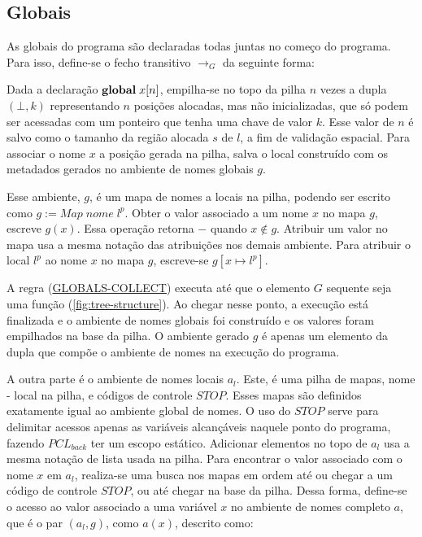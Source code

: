 \subsection{Globais}
\label{sec:pcl-back:semantica:globals}

As globais do programa são declaradas todas juntas no começo do programa. Para isso, define-se o fecho transitivo $\to_G$ da seguinte forma:


\noindent Dada a declaração $\mathbf{global}\;x[n]$, empilha-se no topo da pilha $n$ vezes a dupla $(\bot, k)$ representando $n$ posições alocadas, mas não inicializadas, que só podem ser acessadas com um ponteiro que tenha uma chave de valor $k$. Esse valor de $n$ é salvo como o tamanho da região alocada $s$ de $l$, a fim de validação espacial. Para associar o nome $x$ a posição gerada na pilha, salva o local construído com os metadados gerados no ambiente de nomes globais $g$.

Esse ambiente, $g$, é um mapa de nomes a locais na pilha, podendo ser escrito como $g := Map\;nome\;l^p$. Obter o valor associado a um nome $x$ no mapa $g$, escreve $g(x)$. Essa operação  retorna $-$ quando $x \notin g$. Atribuir um valor no mapa usa a mesma notação das atribuições nos demais ambiente. Para atribuir o local $l^p$ ao nome $x$ no mapa $g$, escreve-se $g[x \mapsto l^p]$. 

A regra (\hyperref[rule:globals-collect]{GLOBALS-COLLECT}) executa até que o elemento $G$ sequente seja uma função (\ref{fig:tree-structure}). Ao chegar nesse ponto, a execução está finalizada e o ambiente de nomes globais foi construído e os valores foram empilhados na base da pilha. O ambiente gerado $g$ é apenas um elemento da dupla que compõe o ambiente de nomes na execução do programa. 

A outra parte é o ambiente de nomes locais $a_l$. Este, é uma pilha de mapas, nome - local na pilha, e códigos de controle $STOP$. Esses mapas são definidos exatamente igual ao ambiente global de nomes. O uso do $STOP$ serve para delimitar acessos apenas as variáveis alcançáveis naquele ponto do programa, fazendo $PCL_{back}$ ter um escopo estático. Adicionar elementos no topo de $a_l$ usa a mesma notação de lista usada na pilha. Para encontrar o valor associado com o nome $x$ em $a_l$, realiza-se uma busca nos mapas em ordem até ou chegar a um código de controle $STOP$, ou até chegar na base da pilha. Dessa forma, define-se o acesso ao valor associado a uma variável $x$ no ambiente de nomes completo $a$, que é o par $(a_l, g)$, como $a(x)$, descrito como:

